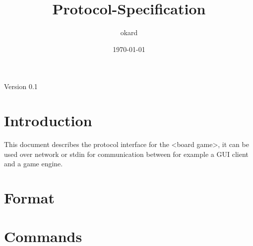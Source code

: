 \documentclass{article}
\title{Protocol-Specification}
\author{okard}
\date{\today}
\begin{document}
Version 0.1

\section{Introduction}
This document describes the protocol interface for the <board game>, it can be used over network or stdin for communication between for example a GUI client and a game engine.

\section{Format}

\section{Commands}
\end{document}
